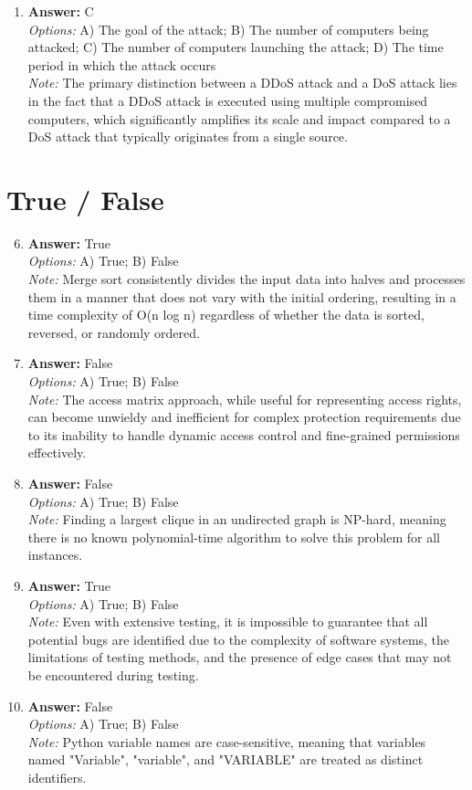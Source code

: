 \documentclass[12pt]{article}
\begin{document}
\begin{enumerate}[label=\arabic*.]
\item \textbf{Answer:} C
\\ \textit{Options:} A) The goal of the attack; B) The number of computers being attacked; C) The number of computers launching the attack; D) The time period in which the attack occurs
\\ \textit{Note:} The primary distinction between a DDoS attack and a DoS attack lies in the fact that a DDoS attack is executed using multiple compromised computers, which significantly amplifies its scale and impact compared to a DoS attack that typically originates from a single source.
\end{enumerate}

\section*{True / False}
\begin{enumerate}[label=\arabic*.]
\setcounter{enumi}{5}
\item \textbf{Answer:} True
\\ \textit{Options:} A) True; B) False
\\ \textit{Note:} Merge sort consistently divides the input data into halves and processes them in a manner that does not vary with the initial ordering, resulting in a time complexity of O(n log n) regardless of whether the data is sorted, reversed, or randomly ordered.
\item \textbf{Answer:} False
\\ \textit{Options:} A) True; B) False
\\ \textit{Note:} The access matrix approach, while useful for representing access rights, can become unwieldy and inefficient for complex protection requirements due to its inability to handle dynamic access control and fine-grained permissions effectively.
\item \textbf{Answer:} False
\\ \textit{Options:} A) True; B) False
\\ \textit{Note:} Finding a largest clique in an undirected graph is NP-hard, meaning there is no known polynomial-time algorithm to solve this problem for all instances.
\item \textbf{Answer:} True
\\ \textit{Options:} A) True; B) False
\\ \textit{Note:} Even with extensive testing, it is impossible to guarantee that all potential bugs are identified due to the complexity of software systems, the limitations of testing methods, and the presence of edge cases that may not be encountered during testing.
\item \textbf{Answer:} False
\\ \textit{Options:} A) True; B) False
\\ \textit{Note:} Python variable names are case-sensitive, meaning that variables named "Variable", "variable", and "VARIABLE" are treated as distinct identifiers.
\end{enumerate}
\end{document}
